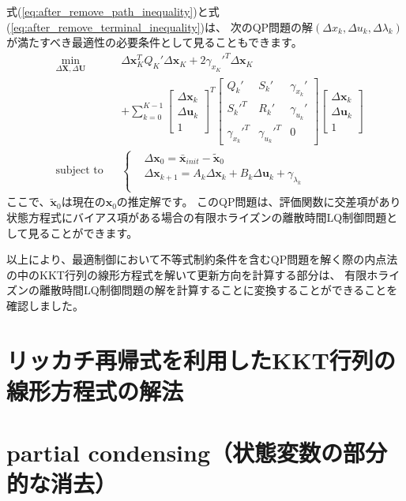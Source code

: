\documentclass[a4paper]{jarticle}
\begin{document}
式(\ref{eq:after_remove_path_inequality})と式(\ref{eq:after_remove_terminal_inequality})は、
次のQP問題の解$(\Delta x_k,\Delta u_k,\Delta \lambda_k)$が満たすべき最適性の必要条件として見ることもできます。
\begin{equation*}
\begin{aligned}
& \underset{ \Delta\mathbf{X}, \Delta\mathbf{U}}{\text{min}} && 
\Delta \mathbf{x}_K^TQ_K'\Delta \mathbf{x}_K + 2 \gamma_{x_K}'^T\Delta \mathbf{x}_K
\\
&  && 
+
\sum_{k=0}^{K-1}
\begin{bmatrix} \Delta \mathbf{x}_k \\ \Delta \mathbf{u}_k \\ 1\end{bmatrix}^T
\begin{bmatrix} Q_k' & S_k' & \gamma_{x_k}' \\ S_k'^T & R_k' & \gamma_{u_k}' \\ \gamma_{x_k}'^T & \gamma_{u_k}'^T & 0\end{bmatrix}
\begin{bmatrix} \Delta \mathbf{x}_k \\ \Delta \mathbf{u}_k \\ 1\end{bmatrix} \\
&\text{subject to} && \left \{
\begin{aligned}
    & \Delta\mathbf{x}_0 = \bar{\mathbf{x}}_{init} - \tilde{\mathbf{x}}_{0}\\
    & \Delta \mathbf{x}_{k+1} = A_k \Delta \mathbf{x}_k + B_k \Delta \mathbf{u}_k + \gamma_{\lambda_k}\\
\end{aligned}
\right .
\end{aligned}
\end{equation*}
ここで、$\tilde{\mathbf{x}}_{0}$は現在の$\mathbf{x}_0$の推定解です。
このQP問題は、評価関数に交差項があり状態方程式にバイアス項がある場合の有限ホライズンの離散時間LQ制御問題として見ることができます。

以上により、最適制御において不等式制約条件を含むQP問題を解く際の内点法の中のKKT行列の線形方程式を解いて更新方向を計算する部分は、
有限ホライズンの離散時間LQ制御問題の解を計算することに変換することができることを確認しました。

\section{リッカチ再帰式を利用したKKT行列の線形方程式の解法}
\label{sec:riccati_recursion}
\section{partial condensing（状態変数の部分的な消去）}



\end{document}

